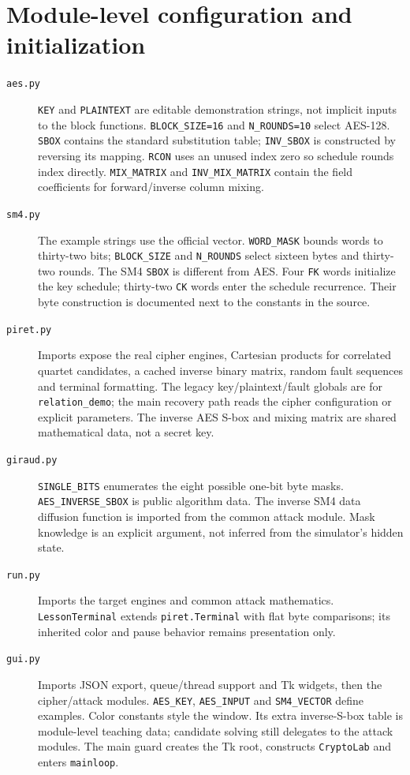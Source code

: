 \section{Module-level configuration and initialization}
\begin{description}
\item[\texttt{aes.py}] \texttt{KEY} and \texttt{PLAINTEXT} are editable demonstration strings, not implicit inputs to the block functions. \texttt{BLOCK\_\allowbreak{}SIZE=16} and \texttt{N\_\allowbreak{}ROUNDS=10} select AES-128. \texttt{SBOX} contains the standard substitution table; \texttt{INV\_\allowbreak{}SBOX} is constructed by reversing its mapping. \texttt{RCON} uses an unused index zero so schedule rounds index directly. \texttt{MIX\_\allowbreak{}MATRIX} and \texttt{INV\_\allowbreak{}MIX\_\allowbreak{}MATRIX} contain the field coefficients for forward/inverse column mixing.
\item[\texttt{sm4.py}] The example strings use the official vector. \texttt{WORD\_\allowbreak{}MASK} bounds words to thirty-two bits; \texttt{BLOCK\_\allowbreak{}SIZE} and \texttt{N\_\allowbreak{}ROUNDS} select sixteen bytes and thirty-two rounds. The SM4 \texttt{SBOX} is different from AES. Four \texttt{FK} words initialize the key schedule; thirty-two \texttt{CK} words enter the schedule recurrence. Their byte construction is documented next to the constants in the source.
\item[\texttt{piret.py}] Imports expose the real cipher engines, Cartesian products for correlated quartet candidates, a cached inverse binary matrix, random fault sequences and terminal formatting. The legacy key/plaintext/fault globals are for \texttt{relation\_\allowbreak{}demo}; the main recovery path reads the cipher configuration or explicit parameters. The inverse AES S-box and mixing matrix are shared mathematical data, not a secret key.
\item[\texttt{giraud.py}] \texttt{SINGLE\_\allowbreak{}BITS} enumerates the eight possible one-bit byte masks. \texttt{AES\_\allowbreak{}INVERSE\_\allowbreak{}SBOX} is public algorithm data. The inverse SM4 data diffusion function is imported from the common attack module. Mask knowledge is an explicit argument, not inferred from the simulator's hidden state.
\item[\texttt{run.py}] Imports the target engines and common attack mathematics. \texttt{LessonTerminal} extends \texttt{piret.Terminal} with flat byte comparisons; its inherited color and pause behavior remains presentation only.
\item[\texttt{gui.py}] Imports JSON export, queue/thread support and Tk widgets, then the cipher/attack modules. \texttt{AES\_\allowbreak{}KEY}, \texttt{AES\_\allowbreak{}INPUT} and \texttt{SM4\_\allowbreak{}VECTOR} define examples. Color constants style the window. Its extra inverse-S-box table is module-level teaching data; candidate solving still delegates to the attack modules. The main guard creates the Tk root, constructs \texttt{CryptoLab} and enters \texttt{mainloop}.
\end{description}

